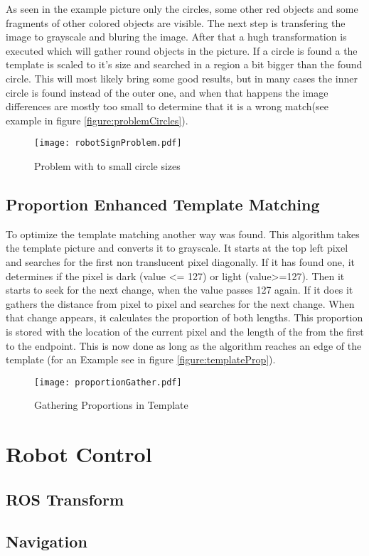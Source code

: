 As seen in the example picture only the circles, some other red objects and some fragments of
other colored objects are visible. The next step is transfering the image to grayscale and 
bluring the image. After that a hugh transformation is executed which will gather round
objects in the picture. If a circle is found a the template is scaled to it's size and 
searched in a region a bit bigger than the found circle.
\newpage
This will most likely bring some good results, but in many cases the inner circle is found
instead of the outer one, and when that happens the image differences are mostly too small
to determine that it is a wrong match(see example in figure \vref{figure:problemCircles}).

\begin{figure}[htp]
\begin{center}
  \texttt{[image: robotSignProblem.pdf]}
  \caption{Problem with to small circle sizes}
  \label{figure:problemCircles}
\end{center}
\end{figure}

\subsection{Proportion Enhanced Template Matching}
To optimize the template matching another way was found. This algorithm
takes the template picture and converts it to grayscale. It starts at the top left pixel
and searches for the first non translucent pixel diagonally. If it has found one,
it determines if the pixel is dark (value <= 127) or light (value>=127). Then it
starts to seek for the next change, when the value passes 127 again. If it does
it gathers the distance from pixel to pixel and searches for the next change.
When that change appears, it calculates the proportion of both lengths.
This proportion is stored with the location of the current pixel and the
length of the from the first to the endpoint. This is now done as long
as the algorithm reaches an edge of the template (for an Example see in figure \vref{figure:templateProp}).

\begin{figure}[htp]
\begin{center}
  \texttt{[image: proportionGather.pdf]}
  \caption{Gathering Proportions in Template}
  \label{figure:templateProp}
\end{center}
\end{figure}


\section{Robot Control}
\subsection{ROS Transform}
\subsection{Navigation}
